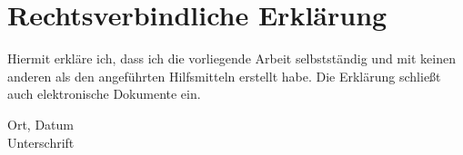 \chapter*{Rechtsverbindliche Erklärung}
\vspace{1cm}
Hiermit erkläre ich, dass ich die vorliegende Arbeit selbstständig und mit keinen anderen als den angeführten Hilfsmitteln erstellt habe. Die Erklärung schließt auch elektronische Dokumente ein. \vspace{2cm}

Ort, Datum \\

Unterschrift